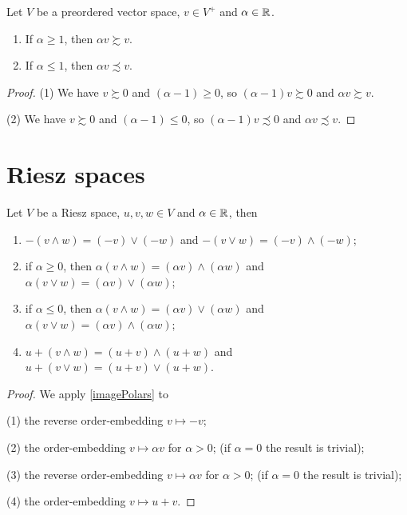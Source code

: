 \begin{lemma} \label{scalarMultiplicationInequalities}
Let $V$ be a preordered vector space, $v\in V^+$ and $\alpha\in \mathbb{R}$.
\begin{enumerate}
\item If $\alpha \geq 1$, then $\alpha v \succsim v$.
\item If $\alpha \leq 1$, then $\alpha v \precsim v$.
\end{enumerate}
\end{lemma}
\begin{proof}
(1) We have $v\succsim 0$ and $(\alpha-1) \geq 0$, so $(\alpha-1)v \succsim 0$ and $\alpha v \succsim v$.

(2) We have $v\succsim 0$ and $(\alpha-1) \leq 0$, so $(\alpha-1)v \precsim 0$ and $\alpha v \precsim v$.
\end{proof}

\section{Riesz spaces}

\begin{lemma} \label{lemmaRieszSpaces}
Let $V$ be a Riesz space, $u,v,w\in V$ and $\alpha\in \mathbb{R}$, then
\begin{enumerate}
\item $-(v \wedge w) = (-v)\vee (-w)$ and $-(v \vee w) = (-v)\wedge (-w)$;
\item if $\alpha \geq 0$, then $\alpha(v \wedge w) = (\alpha v)\wedge (\alpha w)$ and $\alpha(v \vee w) = (\alpha v)\vee (\alpha w)$;
\item if $\alpha \leq 0$, then $\alpha(v \wedge w) = (\alpha v)\vee (\alpha w)$ and $\alpha(v \vee w) = (\alpha v)\wedge (\alpha w)$;
\item $u+(v \wedge w) = (u+v)\wedge (u+w)$ and $u+(v \vee w) = (u+v)\vee (u+w)$.
\end{enumerate}
\end{lemma}
\begin{proof}
We apply \ref{imagePolars} to

(1) the reverse order-embedding $v\mapsto -v$;

(2) the order-embedding $v\mapsto \alpha v$ for $\alpha > 0$; (if $\alpha = 0$ the result is trivial);

(3) the reverse order-embedding $v\mapsto \alpha v$ for $\alpha > 0$; (if $\alpha = 0$ the result is trivial);

(4) the order-embedding $v\mapsto u+v$.
\end{proof}

